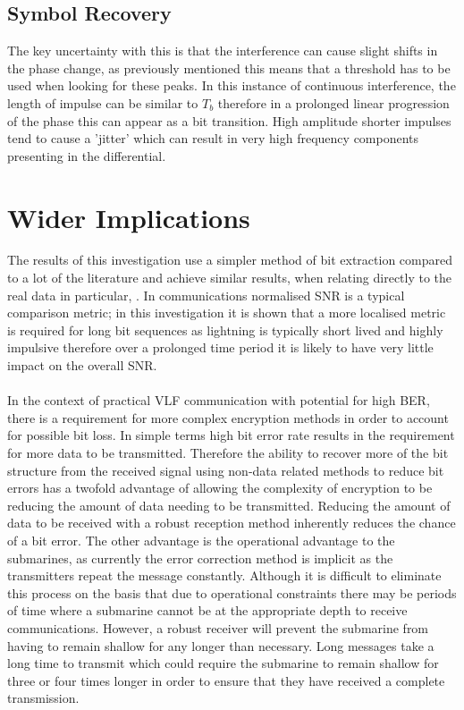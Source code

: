 \subsection{Symbol Recovery}
The key uncertainty with this is that the interference can cause slight shifts in the phase change, as previously mentioned this means that a threshold has to be used when looking for these peaks. In this instance of continuous interference, the length of impulse can be similar to $T_b$ therefore in a prolonged linear progression of the phase this can appear as a bit transition. High amplitude shorter impulses tend to cause a 'jitter' which can result in very high frequency components presenting in the differential.

\section{Wider Implications}
The results of this investigation use a simpler method of bit extraction compared to a lot of the literature and achieve similar results, when relating directly to the real data in particular, \cite{Yang2016}. In communications normalised SNR is a typical comparison metric; in this investigation it is shown that a more localised metric is required for long bit sequences as lightning is typically short lived and highly impulsive therefore over a prolonged time period it is likely to have very little impact on the overall SNR. 
\\\\
In the context of practical VLF communication with potential for high BER, there is a requirement for more complex encryption methods in order to account for possible bit loss. In simple terms high bit error rate results in the requirement for more data to be transmitted. Therefore the ability to recover more of the bit structure from the received signal using non-data related methods to reduce bit errors has a twofold advantage of allowing the complexity of encryption to be reducing the amount of data needing to be transmitted. Reducing the amount of data to be received with a robust reception method inherently reduces the chance of a bit error. The other advantage is the operational advantage to the submarines, as currently the error correction method is implicit as the transmitters repeat the message constantly. Although it is difficult to eliminate this process on the basis that due to operational constraints there may be periods of time where a submarine cannot be at the appropriate depth to receive communications. However, a robust receiver will prevent the submarine from having to remain shallow for any longer than necessary. Long messages take a long time to transmit which could require the submarine to remain shallow for three or four times longer in order to ensure that they have received a complete transmission.